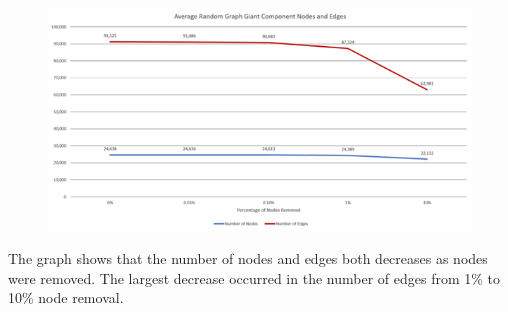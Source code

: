 \documentclass[conference]{IEEEtran}
\begin{document}
			\begin{figure}[htbp]
				\centerline{\includegraphics[width=\linewidth]{./images/robust_random_component.png}}
				\label{robust_random_component}
			\end{figure}
			{
				The graph shows that the number of nodes and edges both decreases as nodes were removed. The largest decrease occurred in the number of edges from 1\% to 10\% node removal.
			\par}
		
\end{document}
